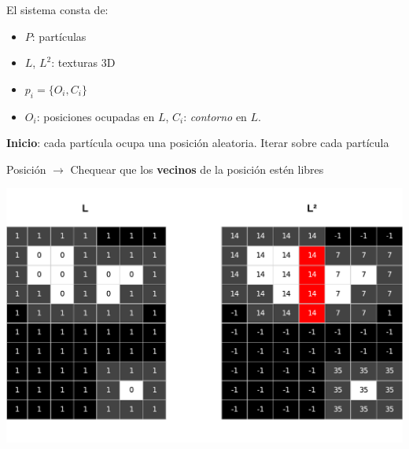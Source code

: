 \documentclass[spanish,unknownkeysallowed,10pt]{beamer}
\begin{document}
\begin{frame}
El sistema consta de:
\begin{itemize}
\item $P$: partículas
\item $L$, $L^{2}$: texturas 3D
\end{itemize}

\begin{itemize}
\item  $p_{i} = \{O_{i}, C_{i}\}$
\end{itemize}

\begin{itemize}
\item $O_{i}$: posiciones ocupadas en $L$, $C_{i}$: {\em contorno} en $L$.
\end{itemize}

\textbf{Inicio}: cada partícula ocupa una posición aleatoria. Iterar sobre cada partícula

Posición $\rightarrow$ Chequear que los \textbf{vecinos} de la posición estén libres

\centerline{\includegraphics[scale = 0.35]{../figures/sistemaparticulas}}

\end{frame}
\end{document}
